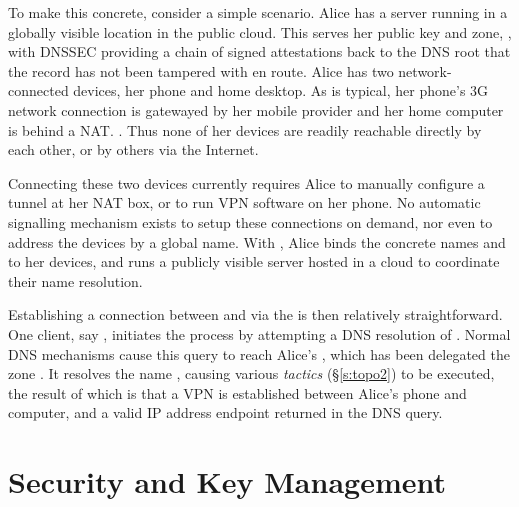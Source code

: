 
To make this concrete, consider a simple scenario. Alice has a \signpost server
running in a globally visible location in the public cloud. This serves her
public key and zone, , with DNSSEC providing a chain of signed
attestations back to the DNS root that the record has not been tampered with en
route. Alice has two network-connected devices, her phone and home desktop.  As
is typical, her phone's 3G network connection is gatewayed by her mobile
provider and her home computer is behind a NAT.  . Thus
none of her devices are readily reachable directly by each other, or by others
via the Internet.

Connecting these two devices currently requires Alice to manually configure a
tunnel at her NAT box, or to run VPN software on her phone. No automatic
signalling mechanism exists to setup these connections on demand, nor even to
address the devices by a global name. With \signpost, Alice binds the concrete
names  and  to her devices, and runs a publicly visible
server hosted in a cloud to coordinate their name resolution.

Establishing a connection between  and  via the \signpost
is then relatively straightforward. One client, say , initiates the
process by attempting a DNS resolution of . Normal DNS
mechanisms cause this query to reach Alice's \signpost, which has been delegated
the zone . It resolves the name , causing various
\emph{tactics} (\S\ref{s:topo2}) to be executed, the result of which is that a
VPN is established between Alice's phone and computer, and a valid IP address
endpoint returned in the DNS query.




\section{Security and Key Management} \label{signpost-security}

